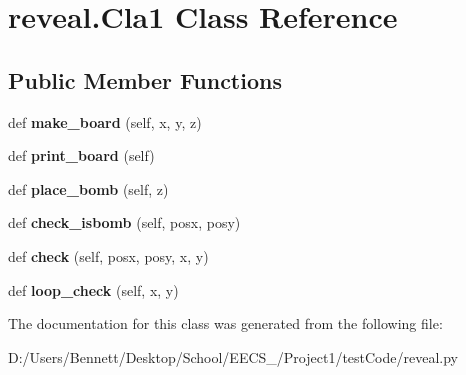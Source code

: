 \hypertarget{classreveal_1_1_cla1}{}\section{reveal.\+Cla1 Class Reference}
\label{classreveal_1_1_cla1}
\subsection*{Public Member Functions}
\begin{DoxyCompactItemize}
\item 
\mbox{\label{classreveal_1_1_cla1_af3b73e63924ed897e06bf4ab2d90b573}} 
def {\bfseries make\+\_\+board} (self, x, y, z)
\item 
\mbox{\label{classreveal_1_1_cla1_a2c14a5c0e6b8c0cc66931fb0b51b1858}} 
def {\bfseries print\+\_\+board} (self)
\item 
\mbox{\label{classreveal_1_1_cla1_aa3e5f37196a7cac9b75f68169a5ffabb}} 
def {\bfseries place\+\_\+bomb} (self, z)
\item 
\mbox{\label{classreveal_1_1_cla1_a41aa1e31df7e4421fe0ecac9a8471f98}} 
def {\bfseries check\+\_\+isbomb} (self, posx, posy)
\item 
\mbox{\label{classreveal_1_1_cla1_a3527258ba4eca9ff2224719a8bd40b0c}} 
def {\bfseries check} (self, posx, posy, x, y)
\item 
\mbox{\label{classreveal_1_1_cla1_a6024694230e7932be061a42e39df0de9}} 
def {\bfseries loop\+\_\+check} (self, x, y)
\end{DoxyCompactItemize}


The documentation for this class was generated from the following file\+:\begin{DoxyCompactItemize}
\item 
D\+:/\+Users/\+Bennett/\+Desktop/\+School/\+E\+E\+C\+S\+\_/\+Project1/test\+Code/reveal.\+py\end{DoxyCompactItemize}
